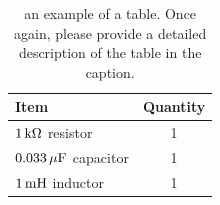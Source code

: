 \documentclass[11pt]{texMemo-gibbons}
\begin{document}
\begin{table}[h!]
  \centering
  \begin{tabular}{ l | c }
    \textbf{Item} & \textbf{Quantity} \\
    \hline
    $\unit[1]{k\Omega}$ resistor & 1\\
    $\unit[0.033]{\mu F}$ capacitor & 1\\
    $\unit[1]{mH}$ inductor & 1\\
  \end{tabular}
  \caption{an example of a table.  Once again, please provide a detailed description of the table in the caption.}
  \label{tab:ex02}
\end{table}
\end{document}
